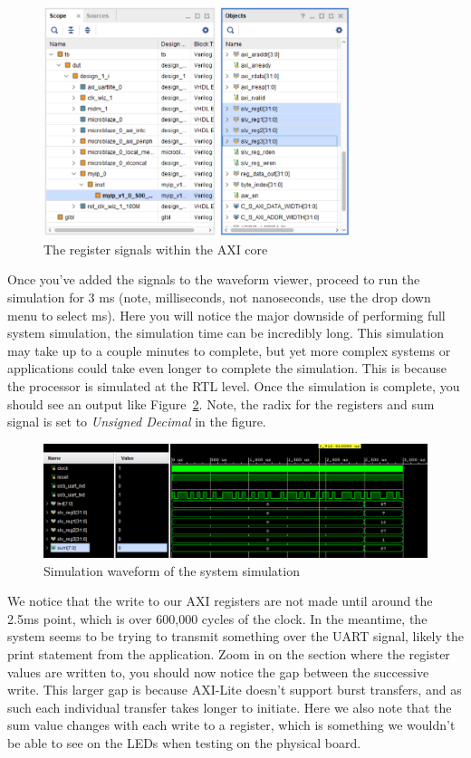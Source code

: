 \documentclass[11pt]{article}
\begin{document}
\begin{figure}[!h]
    \centering
    \includegraphics[width=0.8\textwidth]{images/ip_signals.png}
    \caption{The register signals within the AXI core}
    \label{fig:ip_signals}
\end{figure}

Once you've added the signals to the waveform viewer, proceed to run the simulation for 3 ms (note, milliseconds, not nanoseconds, use the drop down menu to select ms). Here you will notice the major downside of performing full system simulation, the simulation time can be incredibly long. This simulation may take up to a couple minutes to complete, but yet more complex systems or applications could take even longer to complete the simulation. This is because the processor is simulated at the RTL level. Once the simulation is complete, you should see an output like Figure~\ref{fig:sys_waveform}. Note, the radix for the registers and sum signal is set to \textit{Unsigned Decimal} in the figure.

\begin{figure}[!h]
    \centering
    \includegraphics[width=\textwidth]{images/sys_waveform.png}
    \caption{Simulation waveform of the system simulation}
    \label{fig:sys_waveform}
\end{figure}

We notice that the write to our AXI registers are not made until around the 2.5ms point, which is over 600,000 cycles of the clock. In the meantime, the system seems to be trying to transmit something over the UART signal, likely the print statement from the application. Zoom in on the section where the register values are written to, you should now notice the gap between the successive write. This larger gap is because AXI-Lite doesn't support burst transfers, and as such each individual transfer takes longer to initiate. Here we also note that the sum value changes with each write to a register, which is something we wouldn't be able to see on the LEDs when testing on the physical board.
\end{document}
